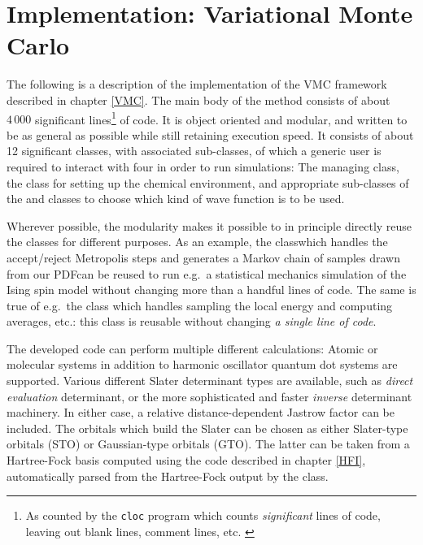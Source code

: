 \documentclass[../../master.tex]{subfiles}
\begin{document}
\chapter{Implementation: Variational Monte Carlo \label{VMCimplementation}}
The following is a description of the implementation of the VMC framework described in chapter \ref{VMC}. The main body of the method consists of about $4\,000$ significant lines\footnote{As counted by the \lstinline{cloc} program which counts \emph{significant} lines of code, leaving out blank lines, comment lines, etc. \cite{cloc}} of \CC{}  code. It is object oriented and modular, and written to be as general as possible while still retaining execution speed. It consists of about 12 significant classes, with associated sub-classes, of which a generic user is required to interact with four in order to run simulations: The managing  class, the  class for setting up the chemical environment, and appropriate sub-classes of the  and  classes to choose which kind of wave function is to be used.

Wherever possible, the modularity makes it possible to in principle directly reuse the classes for different purposes. As an example, the  class\textemdash which handles the accept/reject Metropolis steps and generates a Markov chain of samples drawn from our PDF\textemdash can be reused to run e.g.\ a statistical mechanics simulation of the Ising spin model without changing more than a handful lines of code. The same is true of e.g.\ the  class which handles sampling the local energy and computing averages, etc.: this class is reusable without changing \emph{a single line of code}.

The developed code can perform multiple different calculations: Atomic or molecular systems in addition to harmonic oscillator quantum dot systems are supported. Various different Slater determinant types are available, such as \emph{direct evaluation} determinant, or the more sophisticated and faster \emph{inverse} determinant machinery. In either case, a relative distance-dependent Jastrow factor can be included. The orbitals which build the Slater can be chosen as either Slater-type orbitals (STO) or Gaussian-type orbitals (GTO). The latter can be taken from a Hartree-Fock basis computed using the code described in chapter \ref{HFI}, automatically parsed from the Hartree-Fock output by the  class. 
\end{document}
